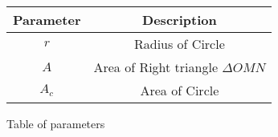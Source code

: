 \renewcommand\thetable{1}
\begin{tabular}{|c|c|}
    \hline 
    \textbf{Parameter}&\textbf{Description} \\
    \hline
    $r$ & Radius of Circle \\
    \hline
	$A$ & Area of Right triangle $\Delta OMN$ \\
    \hline
    $A_c$ & Area of Circle \\
    \hline
\end{tabular}

\caption{Table of parameters}
\label{Table:1}

